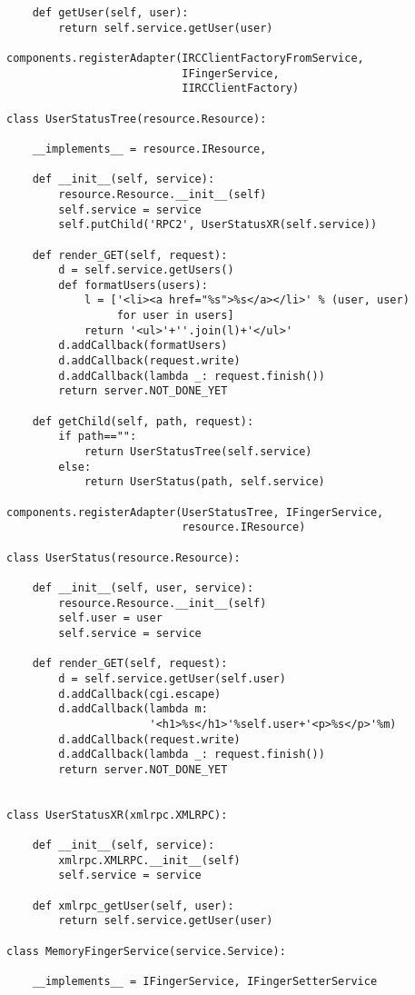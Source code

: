 \begin{verbatim}
    def getUser(self, user):
        return self.service.getUser(user)

components.registerAdapter(IRCClientFactoryFromService,
                           IFingerService,
                           IIRCClientFactory)

class UserStatusTree(resource.Resource):

    __implements__ = resource.IResource,

    def __init__(self, service):
        resource.Resource.__init__(self)
        self.service = service
        self.putChild('RPC2', UserStatusXR(self.service))

    def render_GET(self, request):
        d = self.service.getUsers()
        def formatUsers(users):
            l = ['<li><a href="%s">%s</a></li>' % (user, user)
                 for user in users]
            return '<ul>'+''.join(l)+'</ul>'
        d.addCallback(formatUsers)
        d.addCallback(request.write)
        d.addCallback(lambda _: request.finish())
        return server.NOT_DONE_YET

    def getChild(self, path, request):
        if path=="":
            return UserStatusTree(self.service)
        else:
            return UserStatus(path, self.service)

components.registerAdapter(UserStatusTree, IFingerService,
                           resource.IResource)

class UserStatus(resource.Resource):

    def __init__(self, user, service):
        resource.Resource.__init__(self)
        self.user = user
        self.service = service

    def render_GET(self, request):
        d = self.service.getUser(self.user)
        d.addCallback(cgi.escape)
        d.addCallback(lambda m:
                      '<h1>%s</h1>'%self.user+'<p>%s</p>'%m)
        d.addCallback(request.write)
        d.addCallback(lambda _: request.finish())
        return server.NOT_DONE_YET


class UserStatusXR(xmlrpc.XMLRPC):

    def __init__(self, service):
        xmlrpc.XMLRPC.__init__(self)
        self.service = service

    def xmlrpc_getUser(self, user):
        return self.service.getUser(user)

class MemoryFingerService(service.Service):

    __implements__ = IFingerService, IFingerSetterService


\end{verbatim}
